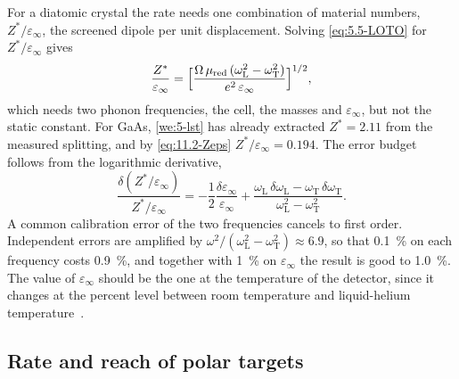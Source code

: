 For a diatomic crystal the rate needs one combination of material numbers, $Z^*/\varepsilon_\infty$, the screened dipole per unit displacement. Solving \cref{eq:5.5-LOTO} for $Z^*/\varepsilon_\infty$ gives
\begin{equation}
  \frac{Z^*}{\varepsilon_\infty} = \Bigl[\frac{\Omega\,\mu_{\mathrm{red}}\,(\omega_{\mathrm{L}}^2 - \omega_{\mathrm{T}}^2)}{e^2\,\varepsilon_\infty}\Bigr]^{1/2} ,
  \label{eq:11.2-Zeps}
\end{equation}
which needs two phonon frequencies, the cell, the masses and $\varepsilon_\infty$, but not the static constant. For GaAs, \cref{we:5-lst} has already extracted $Z^* = 2.11$ from the measured splitting, and by \cref{eq:11.2-Zeps} $Z^*/\varepsilon_\infty = 0.194$. The error budget follows from the logarithmic derivative,
\begin{equation*}
  \frac{\delta(Z^*/\varepsilon_\infty)}{Z^*/\varepsilon_\infty} = -\frac12\frac{\delta\varepsilon_\infty}{\varepsilon_\infty} + \frac{\omega_{\mathrm{L}}\,\delta\omega_{\mathrm{L}} - \omega_{\mathrm{T}}\,\delta\omega_{\mathrm{T}}}{\omega_{\mathrm{L}}^2 - \omega_{\mathrm{T}}^2} .
\end{equation*}
A common calibration error of the two frequencies cancels to first order. Independent errors are amplified by $\omega^2/(\omega_{\mathrm{L}}^2 - \omega_{\mathrm{T}}^2) \approx 6.9$, so that \SI{0.1}{\percent} on each frequency costs \SI{0.9}{\percent}, and together with \SI{1}{\percent} on $\varepsilon_\infty$ the result is good to \SI{1.0}{\percent}. The value of $\varepsilon_\infty$ should be the one at the temperature of the detector, since it changes at the percent level between room temperature and liquid-helium temperature~\cite{griffin2018directional}.

\subsection{Rate and reach of polar targets}\label{sec:11.2-targets}

